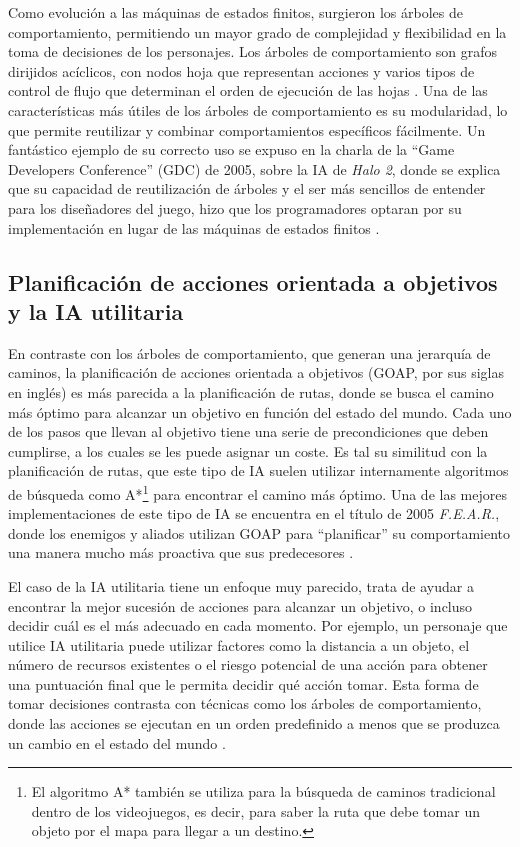 Como evolución a las máquinas de estados finitos, surgieron los árboles de comportamiento, permitiendo un mayor grado de complejidad y flexibilidad en la toma de decisiones de los personajes. Los árboles de comportamiento son grafos dirijidos acíclicos, con nodos hoja que representan acciones y varios tipos de control de flujo que determinan el orden de ejecución de las hojas \cite{epic_games_behavior_2024}. Una de las características más útiles de los árboles de comportamiento es su modularidad, lo que permite reutilizar y combinar comportamientos específicos fácilmente. Un fantástico ejemplo de su correcto uso se expuso en la charla de la ``Game Developers Conference'' (GDC) de 2005, sobre la IA de \textit{Halo 2}, donde se explica que su capacidad de reutilización de árboles y el ser más sencillos de entender para los diseñadores del juego, hizo que los programadores optaran por su implementación en lugar de las máquinas de estados finitos \cite{isla_managing_2005}.


\subsection{Planificación de acciones orientada a objetivos y la IA utilitaria}

En contraste con los árboles de comportamiento, que generan una jerarquía de caminos, la planificación de acciones orientada a objetivos (GOAP, por sus siglas en inglés) es más parecida a la planificación de rutas, donde se busca el camino más óptimo para alcanzar un objetivo en función del estado del mundo. Cada uno de los pasos que llevan al objetivo tiene una serie de precondiciones que deben cumplirse, a los cuales se les puede asignar un coste. Es tal su similitud con la planificación de rutas, que este tipo de IA suelen utilizar internamente algoritmos de búsqueda como A*\footnote{El algoritmo A* también se utiliza para la búsqueda de caminos tradicional dentro de los videojuegos, es decir, para saber la ruta que debe tomar un objeto por el mapa para llegar a un destino.} para encontrar el camino más óptimo. Una de las mejores implementaciones de este tipo de IA se encuentra en el título de 2005 \textit{F.E.A.R.}, donde los enemigos y aliados utilizan GOAP para ``planificar'' su comportamiento una manera mucho más proactiva que sus predecesores \cite{jeff_gdc_2006}.

El caso de la IA utilitaria tiene un enfoque muy parecido, trata de ayudar a encontrar la mejor sucesión de acciones para alcanzar un objetivo, o incluso decidir cuál es el más adecuado en cada momento. Por ejemplo, un personaje que utilice IA utilitaria puede utilizar factores como la distancia a un objeto, el número de recursos existentes o el riesgo potencial de una acción para obtener una puntuación final que le permita decidir qué acción tomar. Esta forma de tomar decisiones contrasta con técnicas como los árboles de comportamiento, donde las acciones se ejecutan en un orden predefinido a menos que se produzca un cambio en el estado del mundo \cite{thompson_ai_2024}.


